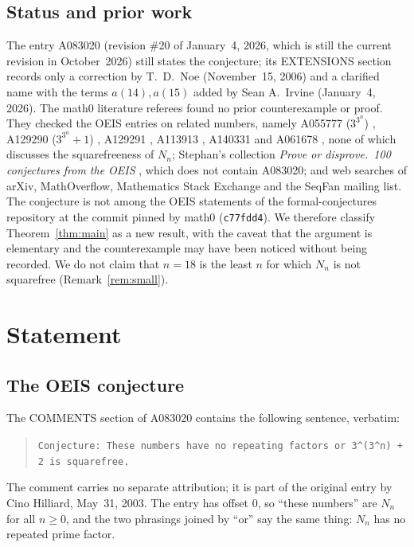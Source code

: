 \documentclass[11pt]{amsart}
\theoremstyle{plain}
\theoremstyle{definition}
\begin{document}
\subsection*{Status and prior work}
The entry A083020 (revision \#20 of January~4, 2026, which is still the current revision in October~2026) still states the conjecture; its EXTENSIONS section records only a correction by T.~D.~Noe (November~15, 2006) and a clarified name with the terms $a(14),a(15)$ added by Sean A.~Irvine (January~4, 2026).
The math0 literature referees found no prior counterexample or proof.
They checked the OEIS entries on related numbers, namely A055777 ($3^{3^n}$) \cite{A055777}, A129290 ($3^{3^n}+1$) \cite{A129290}, A129291 \cite{A129291}, A113913 \cite{A113913}, A140331 \cite{A140331} and A061678 \cite{A061678}, none of which discusses the squarefreeness of $N_n$; Stephan's collection \emph{Prove or disprove.\ 100 conjectures from the OEIS} \cite{St04}, which does not contain A083020; and web searches of arXiv, MathOverflow, Mathematics Stack Exchange and the SeqFan mailing list.
The conjecture is not among the OEIS statements of the formal-conjectures repository \cite{FC} at the commit pinned by math0 (\texttt{c77fdd4}).
We therefore classify Theorem~\ref{thm:main} as a new result, with the caveat that the argument is elementary and the counterexample may have been noticed without being recorded.
We do not claim that $n=18$ is the least $n$ for which $N_n$ is not squarefree (Remark~\ref{rem:small}).

\section{Statement}\label{sec:statement}

\subsection*{The OEIS conjecture}
The COMMENTS section of A083020 contains the following sentence, verbatim:
\begin{quote}
\raggedright{\small\texttt{Conjecture: These numbers have no repeating factors or 3\^{}(3\^{}n) + 2 is squarefree.}}
\end{quote}
The comment carries no separate attribution; it is part of the original entry by Cino Hilliard, May~31, 2003.
The entry has offset $0$, so ``these numbers'' are $N_n$ for all $n\ge0$, and the two phrasings joined by ``or'' say the same thing: $N_n$ has no repeated prime factor.
\end{document}
